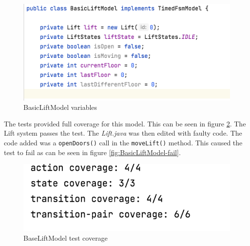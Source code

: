 \documentclass[a4paper, 12pt]{article}
\begin{document}
\begin{figure}
   \centering
   \includegraphics[width=\textwidth,height=\textheight,keepaspectratio]{images/BasicLiftModel-variables} %
   \caption{BasicLiftModel variables}
   \label{fig:BasicLiftModel-variables}
\end{figure}

The tests provided full coverage for this model. This can be seen in figure \ref{fig:BaseLiftModel-coverage}. The Lift system passes the test. The \textit{Lift.java} was then edited with faulty code. The code added was a \texttt{openDoors()} call in the \texttt{moveLift()} method. This caused the test to fail as can be seen in figure \ref{fig:BasicLiftModel-fail}. \\

\begin{figure}
   \centering
   \includegraphics[width=\textwidth,height=\textheight,keepaspectratio]{images/BaseLiftModel-coverage} %
   \caption{BaseLiftModel test coverage}
   \label{fig:BaseLiftModel-coverage}
\end{figure}
\end{document}
